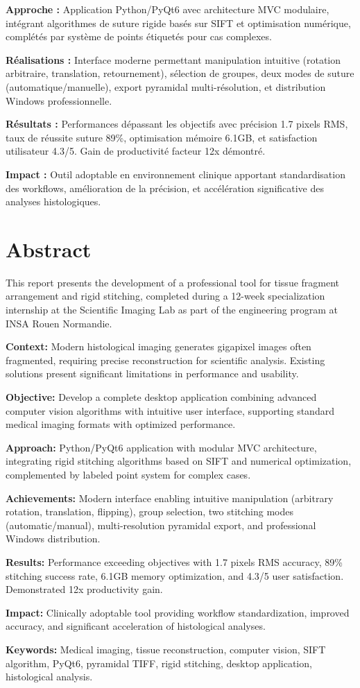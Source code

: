\documentclass[12pt,a4paper]{article}
\begin{document}
\textbf{Approche :} Application Python/PyQt6 avec architecture MVC modulaire, intégrant algorithmes de suture rigide basés sur SIFT et optimisation numérique, complétés par système de points étiquetés pour cas complexes.

\textbf{Réalisations :} Interface moderne permettant manipulation intuitive (rotation arbitraire, translation, retournement), sélection de groupes, deux modes de suture (automatique/manuelle), export pyramidal multi-résolution, et distribution Windows professionnelle.

\textbf{Résultats :} Performances dépassant les objectifs avec précision 1.7 pixels RMS, taux de réussite suture 89\%, optimisation mémoire 6.1GB, et satisfaction utilisateur 4.3/5. Gain de productivité facteur 12x démontré.

\textbf{Impact :} Outil adoptable en environnement clinique apportant standardisation des workflows, amélioration de la précision, et accélération significative des analyses histologiques.

\vspace{1cm}

\section*{Abstract}

This report presents the development of a professional tool for tissue fragment arrangement and rigid stitching, completed during a 12-week specialization internship at the Scientific Imaging Lab as part of the engineering program at INSA Rouen Normandie.

\textbf{Context:} Modern histological imaging generates gigapixel images often fragmented, requiring precise reconstruction for scientific analysis. Existing solutions present significant limitations in performance and usability.

\textbf{Objective:} Develop a complete desktop application combining advanced computer vision algorithms with intuitive user interface, supporting standard medical imaging formats with optimized performance.

\textbf{Approach:} Python/PyQt6 application with modular MVC architecture, integrating rigid stitching algorithms based on SIFT and numerical optimization, complemented by labeled point system for complex cases.

\textbf{Achievements:} Modern interface enabling intuitive manipulation (arbitrary rotation, translation, flipping), group selection, two stitching modes (automatic/manual), multi-resolution pyramidal export, and professional Windows distribution.

\textbf{Results:} Performance exceeding objectives with 1.7 pixels RMS accuracy, 89\% stitching success rate, 6.1GB memory optimization, and 4.3/5 user satisfaction. Demonstrated 12x productivity gain.

\textbf{Impact:} Clinically adoptable tool providing workflow standardization, improved accuracy, and significant acceleration of histological analyses.

\textbf{Keywords:} Medical imaging, tissue reconstruction, computer vision, SIFT algorithm, PyQt6, pyramidal TIFF, rigid stitching, desktop application, histological analysis.
\end{document}
